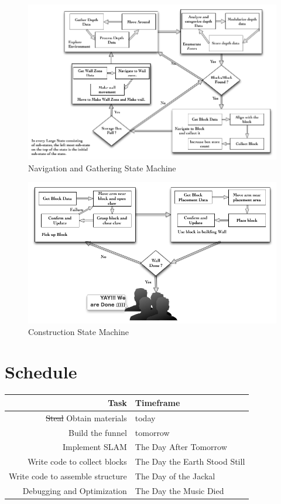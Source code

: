 \documentclass[letterpaper,11pt]{article}
\begin{document}
\begin{figure}[h]
\centering
 \includegraphics[width=6.25in]{images/RSSfsmbigTeam}
\caption{Navigation and Gathering State Machine}
\end{figure}

\begin{figure}[h!]
\centering
 \includegraphics[width=6.25in]{images/WallBuilding}
\caption{Construction State Machine}
\end{figure}

\newpage

\section{Schedule}
\begin{tabular}{r | l}
Task & Timeframe\\
\hline
\sout{Steal} Obtain materials    & today \\
Build the funnel                 & tomorrow \\
Implement SLAM                   & The Day After Tomorrow \\
Write code to collect blocks     & The Day the Earth Stood Still \\
Write code to assemble structure & The Day of the Jackal \\
Debugging and Optimization       & The Day the Music Died
\end{tabular}
\end{document}
